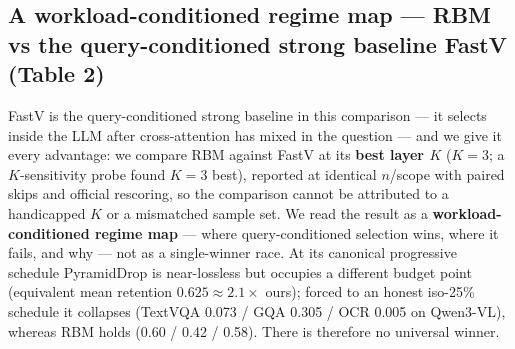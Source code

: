 \documentclass[journal]{IEEEtran}
\begin{document}
\subsection{A workload-conditioned regime map --- RBM vs the query-conditioned strong baseline FastV (Table 2)}\label{sec:fastv}

FastV is the query-conditioned strong baseline in this comparison --- it
selects inside the LLM after cross-attention has mixed in the question --- and
we give it every advantage: we compare RBM against FastV at its \textbf{best
layer $K$} ($K = 3$; a $K$-sensitivity probe found $K = 3$ best), reported at
identical $n$/scope with paired skips and official rescoring, so the comparison
cannot be attributed to a handicapped $K$ or a mismatched sample set. We read
the result as a \textbf{workload-conditioned regime map} --- where
query-conditioned selection wins, where it fails, and why --- not as a
single-winner race. At its canonical progressive schedule
PyramidDrop is near-lossless but occupies a different budget point (equivalent
mean retention $0.625 \approx 2.1\times$ ours); forced to an honest iso-25\%
schedule it collapses (TextVQA 0.073 / GQA 0.305 / OCR 0.005 on Qwen3-VL),
whereas RBM holds (0.60 / 0.42 / 0.58). There is therefore no universal winner.
\end{document}
